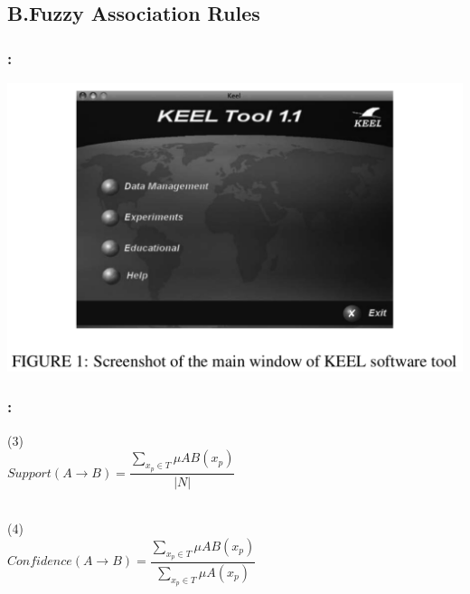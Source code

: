 \documentclass{beamer}
\begin{document}
\begin{CJK*}{UTF8}{bsmi}
\begin{frame}
\end{frame}



\subsection{B.Fuzzy Association Rules}


\begin{frame}
	\frametitle{\insertsection : \insertsubsection}
\begin{center}
\includegraphics[width=1\linewidth]{./1.png}
\end{center}
\end{frame}


\begin{frame}
	\frametitle{\insertsection : \insertsubsection}
	
	\begin{block}{ (3)}
		~\\
		\centering\textbf{$Support(A\longrightarrow B)=\dfrac{\sum_{x_{p}\in T}^{ }{\mu {AB}(x_{p})}}{|N|}$}\\
		~\\
	\end{block}
	\begin{block}{ (4)}
		~\\
		\centering\textbf{$Confidence(A\longrightarrow B)=\dfrac{\sum_{x_{p}\in T}^{ }{\mu {AB}(x_{p})}}{\sum_{x_{p}\in T}^{ }{\mu {A}(x_{p})}}$}\\
		~\\


\end{block}
\end{frame}
\end{CJK*}
\end{document}
